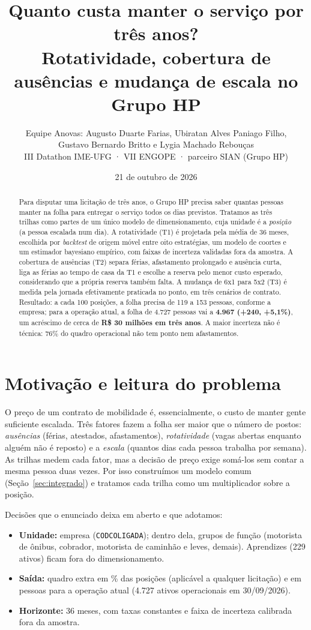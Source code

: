 \documentclass[11pt,a4paper]{article}
\title{\textbf{Quanto custa manter o serviço por três anos?}\\[2pt]
\large Rotatividade, cobertura de ausências e mudança de escala no Grupo HP}
\author{Equipe Anovas: Augusto Duarte Farias, Ubiratan Alves Paniago Filho,\\ Gustavo Bernardo Britto e Lygia Machado Rebouças\\[2pt]
\small III Datathon IME-UFG · VII ENGOPE · parceiro SIAN (Grupo HP)}
\date{21 de outubro de 2026}
\newcommand{\destaque}[1]{\textbf{#1}}
\begin{document}
\maketitle

\begin{abstract}
\noindent Para disputar uma licitação de três anos, o Grupo HP precisa saber quantas pessoas manter na folha para entregar o serviço todos os dias previstos. Tratamos as três trilhas como partes de um único modelo de dimensionamento, cuja unidade é a \emph{posição} (a pessoa escalada num dia). A rotatividade (T1) é projetada pela média de 36 meses, escolhida por \emph{backtest} de origem móvel entre oito estratégias, um modelo de coortes e um estimador bayesiano empírico, com faixas de incerteza validadas fora da amostra. A cobertura de ausências (T2) separa férias, afastamento prolongado e ausência curta, liga as férias ao tempo de casa da T1 e escolhe a reserva pelo menor custo esperado, considerando que a própria reserva também falta. A mudança de 6x1 para 5x2 (T3) é medida pela jornada efetivamente praticada no ponto, em três cenários de contrato. Resultado: a cada 100 posições, a folha precisa de 119 a 153 pessoas, conforme a empresa; para a operação atual, a folha de 4.727 pessoas vai a \destaque{4.967 (+240, +5,1\%)}, um acréscimo de cerca de \destaque{R\$ 30 milhões em três anos}. A maior incerteza não é técnica: 76\% do quadro operacional não tem ponto nem afastamentos.
\end{abstract}

\section{Motivação e leitura do problema}
O preço de um contrato de mobilidade é, essencialmente, o custo de manter gente suficiente escalada. Três fatores fazem a folha ser maior que o número de postos: \emph{ausências} (férias, atestados, afastamentos), \emph{rotatividade} (vagas abertas enquanto alguém não é reposto) e a \emph{escala} (quantos dias cada pessoa trabalha por semana). As trilhas medem cada fator, mas a decisão de preço exige somá-los sem contar a mesma pessoa duas vezes. Por isso construímos um modelo comum (Seção~\ref{sec:integrado}) e tratamos cada trilha como um multiplicador sobre a posição.

\noindent Decisões que o enunciado deixa em aberto e que adotamos:
\begin{itemize}
\item \textbf{Unidade:} empresa (\texttt{CODCOLIGADA}); dentro dela, grupos de função (motorista de ônibus, cobrador, motorista de caminhão e leves, demais). Aprendizes (229 ativos) ficam fora do dimensionamento.
\item \textbf{Saída:} quadro extra em \% das posições (aplicável a qualquer licitação) e em pessoas para a operação atual (4.727 ativos operacionais em 30/09/2026).
\item \textbf{Horizonte:} 36 meses, com taxas constantes e faixa de incerteza calibrada fora da amostra.
\end{itemize}
\end{document}
